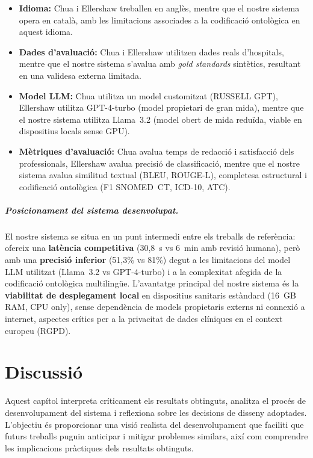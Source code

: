 \documentclass[CAT]{TFUOC}%
\begin{document}
\begin{itemize}
    \item \textbf{Idioma:} Chua i Ellershaw treballen en anglès, mentre que el nostre sistema opera en català, amb les limitacions associades a la codificació ontològica en aquest idioma.
    
    \item \textbf{Dades d'avaluació:} Chua i Ellershaw utilitzen dades reals d'hospitals, mentre que el nostre sistema s'avalua amb \textit{gold standards} sintètics, resultant en una validesa externa limitada.
    
    \item \textbf{Model LLM:} Chua utilitza un model customitzat (RUSSELL GPT), Ellershaw utilitza GPT-4-turbo (model propietari de gran mida), mentre que el nostre sistema utilitza Llama~3.2 (model obert de mida reduïda, viable en dispositius locals sense GPU).
    
    \item \textbf{Mètriques d'avaluació:} Chua avalua temps de redacció i satisfacció dels professionals, Ellershaw avalua precisió de classificació, mentre que el nostre sistema avalua similitud textual (BLEU, ROUGE-L), completesa estructural i codificació ontològica (F1 SNOMED~CT, ICD-10, ATC).
\end{itemize}

\paragraph{Posicionament del sistema desenvolupat.}
El nostre sistema se situa en un punt intermedi entre els treballs de referència: ofereix una \textbf{latència competitiva} (30,8~s vs 6~min amb revisió humana), però amb una \textbf{precisió inferior} (51,3\% vs 81\%) degut a les limitacions del model LLM utilitzat (Llama~3.2 vs GPT-4-turbo) i a la complexitat afegida de la codificació ontològica multilingüe. L'avantatge principal del nostre sistema és la \textbf{viabilitat de desplegament local} en dispositius sanitaris estàndard (16~GB RAM, CPU only), sense dependència de models propietaris externs ni connexió a internet, aspectes crítics per a la privacitat de dades clíniques en el context europeu (RGPD).

\chapter{Discussió}

Aquest capítol interpreta críticament els resultats obtinguts, analitza el procés de desenvolupament del sistema i reflexiona sobre les decisions de disseny adoptades. L'objectiu és proporcionar una visió realista del desenvolupament que faciliti que futurs treballs puguin anticipar i mitigar problemes similars, així com comprendre les implicacions pràctiques dels resultats obtinguts.
\end{document}
